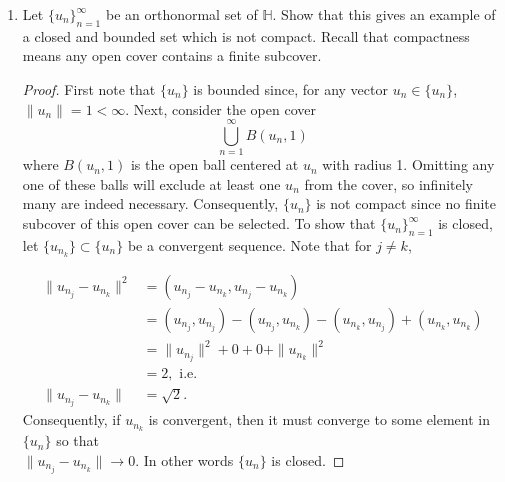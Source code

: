 \documentclass[11pt,oneside,english]{amsart}
\theoremstyle{definition}
\newcommand{\MB}[1]{\mathbb{#1}}
\begin{document}
\begin{enumerate}
\begin{proof}
Since we are in $\MB{R}^2$, observe that 
\begin{align*}
\|A\|^2&=\left[\sup_{\|x\|=1}\|Ax\|\right]^2\\[2mm]
&=\left[\sup_{\|x\|=1}|(Ax,Ax)|\right]^2\\[2mm]
&=\left[\sup_{\|x\|=1}|(x,A^TAx)|\right]^2\\[2mm]
&=\left[\sup_{\|x\|=1}|(x,R^TDRx)|\right]^2\\[2mm]
&=\left[\sup_{\|x\|=1}|(Rx,DRx)|\right]^2\\[2mm]
&=\left[\sup_{\|y\|=1}|(y,Dy)|\right]^2,\\[2mm]
&=\left[\max\{\sqrt{|\lambda_1|},\sqrt{|\lambda_2|}\}\right]^2,
\end{align*}
where $R$ is an orthogonal matrix, $D$ is diagonal, and the diagonal entries of $D$ are $\lambda_1,\lambda_2$ since $\lambda_1,\lambda_2$ are the eigenvalues of $A^TA$. Thus, $\|A\|=\max\{\sqrt{|\lambda_1|},\sqrt{|\lambda_2|}\}$.
\end{proof}




\item Let $\{u_n\}_{n=1}^\infty$ be an orthonormal set of $\MB{H}$.  Show that this gives an example of a closed and bounded set which is not compact. Recall that compactness means any open cover contains a finite subcover.

\begin{proof}
First note that $\{u_n\}$ is bounded since, for any vector $u_n\in\{u_n\}$, $\|u_n\|=1<\infty$. Next, consider the open cover
\[
\bigcup_{n=1}^\infty B(u_n,1)
\]
where $B(u_n,1)$ is the open ball centered at $u_n$ with radius 1. Omitting any one of these balls will exclude at least one $u_n$ from the cover, so infinitely many are indeed necessary. Consequently, $\{u_n\}$ is not compact since no finite subcover of this open cover can be selected. To show that $\{u_n\}_{n=1}^\infty$ is closed, let $\{u_{n_k}\}\subset\{u_n\}$ be a convergent sequence. Note that for $j\neq k$,

\begin{align*}
\|u_{n_j}-u_{n_k}\|^2&=(u_{n_j}-u_{n_k},u_{n_j}-u_{n_k})\\[2mm]
&=(u_{n_j},u_{n_j})-(u_{n_j},u_{n_k})-(u_{n_k},u_{n_j})+(u_{n_k},u_{n_k})\\[2mm]
&=\|u_{n_j}\|^2+0+0+\|u_{n_k}\|^2\\[2mm]
&=2,\text{ i.e.}\\[2mm]
\|u_{n_j}-u_{n_k}\|&=\sqrt{2}.
\end{align*}
Consequently, if $u_{n_k}$ is convergent, then it must converge to some element in $\{u_n\}$ so that \\$\|u_{n_j}-u_{n_k}\|\to0$. In other words $\{u_n\}$ is closed.
\end{proof}


\end{enumerate}
\end{document}
